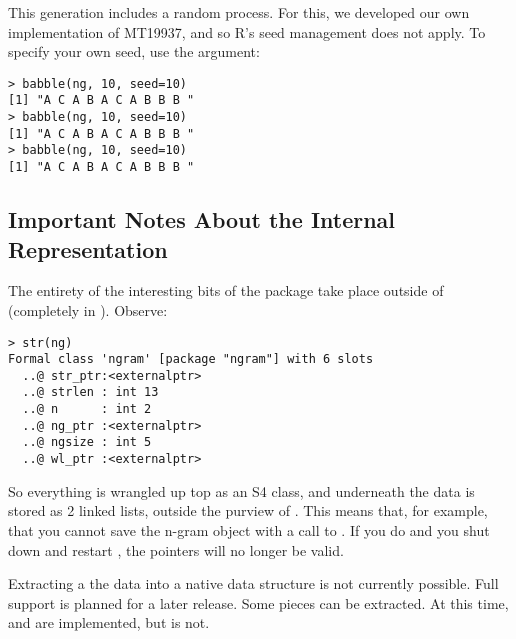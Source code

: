 This generation includes a random process.  For this, we developed our own 
implementation of MT19937, and so R's seed management does not apply.  To 
specify your own seed, use the  argument:
\begin{lstlisting}[language=inteRactive]
> babble(ng, 10, seed=10)
[1] "A C A B A C A B B B "
> babble(ng, 10, seed=10)
[1] "A C A B A C A B B B "
> babble(ng, 10, seed=10)
[1] "A C A B A C A B B B "
\end{lstlisting}




\subsection{Important Notes About the Internal Representation}

The entirety of the interesting bits of the \thispackage package take place 
outside of \R (completely in \C).  Observe:
\begin{lstlisting}[language=inteRactive]
> str(ng)
Formal class 'ngram' [package "ngram"] with 6 slots
  ..@ str_ptr:<externalptr> 
  ..@ strlen : int 13
  ..@ n      : int 2
  ..@ ng_ptr :<externalptr> 
  ..@ ngsize : int 5
  ..@ wl_ptr :<externalptr> 
\end{lstlisting}

So everything is wrangled up top as an S4 class, and underneath the data is 
stored as 2 linked lists, outside the purview of \R.  This means that, for 
example, that you cannot save the n-gram object with a call to .  
If you do and you shut down and restart \R, the pointers will no longer be 
valid.

Extracting a the data into a native \R data structure is not currently 
possible.  Full support is planned for a later release.  Some pieces can be 
extracted.  At this time,  and  are 
implemented, but  is not.
